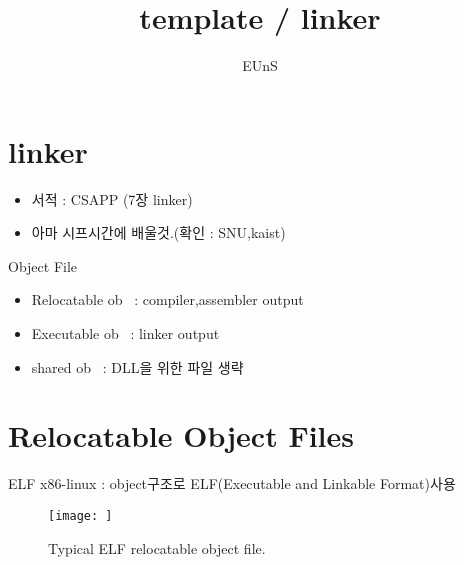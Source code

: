 \documentclass[10pt]{beamer}
\title{template / linker}
\author{EUnS}
\begin{document}

\begin{frame}{}
    \maketitle
\end{frame}    

\begin{frame}{}
    \tableofcontents
\end{frame}   

\section{linker}

\begin{frame}
    \begin{itemize}
        \item 서적 : CSAPP (7장 linker)
        \item 아마 시프시간에 배울것.(확인 : SNU,kaist)
    \end{itemize}
\end{frame}

\begin{frame}{Object File}
    
    \begin{itemize}
        \item Relocatable ob~ : compiler,assembler output
        \item Executable ob~ : linker output
        \item shared ob~ : DLL을 위한 파일 생략
    \end{itemize}
\end{frame}    


\section{Relocatable Object Files}

\begin{frame}{ELF}
    x86-linux : object구조로 ELF(Executable and Linkable Format)사용
    \begin{figure}[h!]
        \centering
        \texttt{[image: ]}
        \caption{Typical ELF relocatable object file.}
    \end{figure}
\end{frame}    
\end{document}
